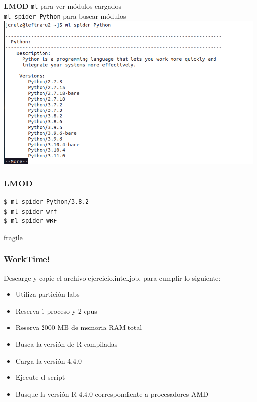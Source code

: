 \documentclass[aspectratio=169,professionalfonts]{beamer}
\newenvironment{minted}[2][]{\VerbatimEnvironment\begin{Verbatim}[#1]}{\end{Verbatim}}
\begin{document}
\begin{frame}{\textbf{LMOD}}
    \texttt{ml} para ver módulos cargados \\ 
    \texttt{ml spider Python} para buscar módulos\\ 
\centering
    \includegraphics[scale=0.35]{FIGURES/ml_spider_python.png} \\
\end{frame} 

\begin{frame}[fragile]
\frametitle{\textbf{LMOD}}
\begin{verbatim}
$ ml spider Python/3.8.2
$ ml spider wrf
$ ml spider WRF
\end{verbatim}
\end{frame}

\begin{frame}{fragile}
\frametitle{\textbf{WorkTime!}}
Descarge y copie el archivo ejercicio.intel.job, para cumplir lo siguiente:
\begin{itemize}
    \item Utiliza partición labs 
         \vspace{0.5em} 
    \item Reserva 1 proceso y 2 cpus
         \vspace{0.5em} 
    \item Reserva 2000 MB de memoria RAM total   
    \vspace{0.5em} 
     \item Busca la versión de R compiladas
          \vspace{0.5em} 
   \item Carga la versión 4.4.0 
        \vspace{0.5em} 
    \item Ejecute el script 
         \vspace{0.5em} 
    \item Busque la versión R 4.4.0 correspondiente a procesadores AMD 
    
\end{itemize}
    
\end{frame}
\end{document}
